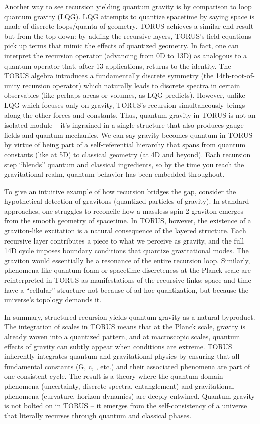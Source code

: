 \documentclass[
]{article}
\begin{document}
Another way to see recursion yielding quantum gravity is by comparison
to loop quantum gravity (LQG). LQG attempts to quantize spacetime by
saying space is made of discrete loops/quanta of geometry. TORUS
achieves a similar end result but from the top down: by adding the
recursive layers, TORUS's field equations pick up terms that mimic the
effects of quantized geometry. In fact, one can interpret the recursion
operator (advancing from 0D to 13D) as analogous to a quantum operator
that, after 13 applications, returns to the identity. The TORUS algebra
introduces a fundamentally discrete symmetry (the 14th-root-of-unity
recursion operator) which naturally leads to discrete spectra in certain
observables (like perhaps areas or volumes, as LQG predicts). However,
unlike LQG which focuses only on gravity, TORUS's recursion
simultaneously brings along the other forces and constants. Thus,
quantum gravity in TORUS is not an isolated module -- it's ingrained in
a single structure that also produces gauge fields and quantum
mechanics. We can say gravity becomes quantum in TORUS by virtue of
being part of a self-referential hierarchy that spans from quantum
constants (like \hbar at 5D) to classical geometry (at 4D and beyond). Each
recursion step ``blends'' quantum and classical ingredients, so by the
time you reach the gravitational realm, quantum behavior has been
embedded throughout.

To give an intuitive example of how recursion bridges the gap, consider
the hypothetical detection of gravitons (quantized particles of
gravity). In standard approaches, one struggles to reconcile how a
massless spin-2 graviton emerges from the smooth geometry of spacetime.
In TORUS, however, the existence of a graviton-like excitation is a
natural consequence of the layered structure. Each recursive layer
contributes a piece to what we perceive as gravity, and the full 14D
cycle imposes boundary conditions that quantize gravitational modes. The
graviton would essentially be a resonance of the entire recursion loop.
Similarly, phenomena like quantum foam or spacetime discreteness at the
Planck scale are reinterpreted in TORUS as manifestations of the
recursive links: space and time have a ``cellular'' structure not
because of ad hoc quantization, but because the universe's topology
demands it.

In summary, structured recursion yields quantum gravity as a natural
byproduct. The integration of scales in TORUS means that at the Planck
scale, gravity is already woven into a quantized pattern, and at
macroscopic scales, quantum effects of gravity can subtly appear when
conditions are extreme. TORUS inherently integrates quantum and
gravitational physics by ensuring that all fundamental constants (G, c,
\hbar, etc.) and their associated phenomena are part of one consistent
cycle. The result is a theory where the quantum-domain phenomena
(uncertainty, discrete spectra, entanglement) and gravitational
phenomena (curvature, horizon dynamics) are deeply entwined. Quantum
gravity is not bolted on in TORUS -- it emerges from the
self-consistency of a universe that literally recurses through quantum
and classical phases.
\end{document}
